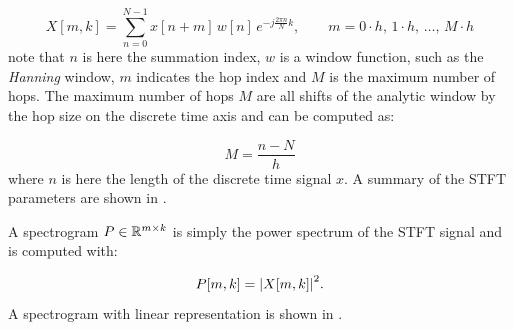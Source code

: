 \begin{equation}\label{eq:signal_spec_stft}
    X[m, k] = \sum_{n=0}^{N-1} x[n + m] \, w[n] \, e^{-j\frac{2 \pi n}{N}k}, \qquad m = 0 \cdot h, \, 1 \cdot h, \, \dots, \, M \cdot h 
\end{equation}
note that $n$ is here the summation index, $w$ is a window function, such as the \emph{Hanning} window, $m$ indicates the hop index and $M$ is the maximum number of hops.
The maximum number of hops $M$ are all shifts of the analytic window by the hop size on the discrete time axis and can be computed as:

\begin{equation}\label{eq:signal_spec_hop}
  M = \frac{n-N}{h}
\end{equation}
where $n$ is here the length of the discrete time signal $x$.
A summary of the STFT parameters are shown in .



A spectrogram $P \in \mathbb{R}^{m \times k}$ is simply the power spectrum of the STFT signal and is computed with:

\begin{equation}\label{eq:signal_spec_spec}
  P[m, k] = \abs{X[m, k]}^2.
\end{equation}
A spectrogram with linear representation is shown in .

